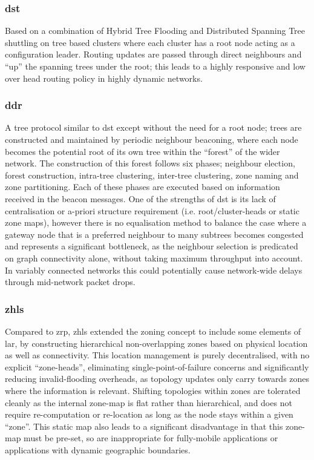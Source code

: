 \subsubsection{\gls{dst}}
Based on a combination of Hybrid Tree Flooding and Distributed Spanning Tree shuttling on tree based clusters where each cluster has a root node acting as a configuration leader. Routing updates are passed through direct neighbours and ``up'' the spanning trees under the root; this leads to a highly responsive and low over head routing policy in highly dynamic networks.\cite{Radhakrishnan1999}\\
\subsubsection{\gls{ddr}} 
A tree protocol similar to \gls{dst} except without the need for a root node; trees are constructed and maintained by periodic neighbour beaconing, where each node becomes the potential root of its own tree within the ``forest'' of the wider network. The construction of this forest follows six phases; neighbour election, forest construction, intra-tree clustering, inter-tree clustering, zone naming and zone partitioning. Each of these phases are executed based on information received in the beacon messages. One of the strengths of \gls{dst} is its lack of centralisation or a-priori structure requirement (i.e. root/cluster-heads or static zone maps), however there is no equalisation method to balance the case where a gateway node that is a preferred neighbour to many subtrees becomes congested and represents a significant bottleneck, as the neighbour selection is predicated on graph connectivity alone, without taking maximum throughput into account. In variably connected networks this could potentially cause network-wide delays through mid-network packet drops.\\
\subsubsection{\gls{zhls}}
Compared to \gls{zrp}, \gls{zhls} extended the zoning concept to include some elements of \gls{lar}, by constructing hierarchical non-overlapping zones based on physical location as well as connectivity. This location management is purely decentralised, with no explicit ``zone-heads'', eliminating single-point-of-failure concerns and significantly reducing invalid-flooding overheads, as topology updates only carry towards zones where the information is relevant. Shifting topologies within zones are tolerated cleanly as the internal zone-map is flat rather than hierarchical, and does not require re-computation or re-location as long as the node stays within a given ``zone''. This static map also leads to a significant disadvantage in that this zone-map must be pre-set, so are inappropriate for fully-mobile applications or applications with dynamic geographic boundaries.\cite{Joa-Ng1999,Hamma2006}
